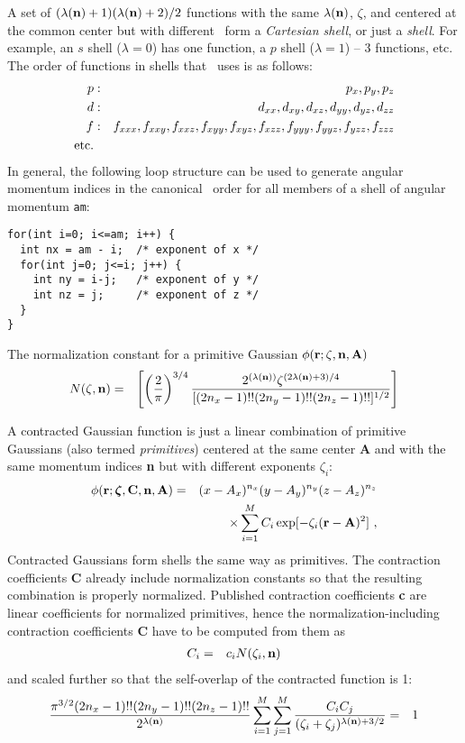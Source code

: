 \documentclass[12pt]{article}
\begin{document}
A set of $(\lambda({\bf n}) + 1)(\lambda({\bf n}) + 2)/2$ functions with the same $\lambda({\bf n})$, $\zeta$, and centered
at the common center
but with different \n\ form a {\em Cartesian shell},
or just a {\em shell}. For example, an $s$ shell ($\lambda=0$) has one function, a $p$ shell ($\lambda=1$) --
3 functions, etc.
The order of functions in shells that \LIBINT\ uses is as follows:
\begin{eqnarray}
p & : & p_x, p_y, p_z \nonumber \\
d & : & d_{xx}, d_{xy}, d_{xz}, d_{yy}, d_{yz}, d_{zz} \nonumber \\
f & : & f_{xxx}, f_{xxy}, f_{xxz}, f_{xyy}, f_{xyz}, f_{xzz}, f_{yyy}, f_{yyz}, f_{yzz}, f_{zzz} \nonumber \\
{\rm etc.} \nonumber
\end{eqnarray}
In general, the following loop structure can be used to generate angular momentum indices in the canonical \LIBINT\ order for all
members of a shell of angular momentum {\tt am}:
\begin{verbatim}
for(int i=0; i<=am; i++) {
  int nx = am - i;  /* exponent of x */
  for(int j=0; j<=i; j++) {
    int ny = i-j;   /* exponent of y */
    int nz = j;     /* exponent of z */
  }
}
\end{verbatim}

The normalization constant for a primitive Gaussian $\phi ({\bf r}; \zeta, {\bf n}, {\bf A})$
\begin{eqnarray}
N(\zeta,{\bf n}) & = & \left[ \left(\frac{2}{\pi}\right)^{3/4}\frac{2^{(\lambda({\bf n}))}\zeta^{(2\lambda({\bf n})+3)/4}}
                {[(2n_x-1)!!(2n_y-1)!!(2n_z-1)!!]^{1/2}} \right]
\end{eqnarray}

A contracted Gaussian function is just a linear combination of primitive Gaussians (also termed {\em primitives})
centered at the same center {\bf A} and with the same momentum indices {\bf n}
but with different exponents $\zeta_i$:
\begin{eqnarray}
\phi ({\bf r}; \bmath{\zeta}, {\bf C}, \n, {\bf A}) & = & (x - A_x)^{n_x} (y - A_y)^{n_y} (z - A_z)^{n_z} \nonumber \\
& & \times \sum_{i=1}^M C_i \exp [-\zeta_i ({\bf r}-{\bf A})^2]\ ,
\end{eqnarray}
Contracted Gaussians form shells the same way as primitives.
The contraction coefficients {\bf C} already include normalization constants so that the resulting combination
is properly normalized. Published contraction coefficients {\bf c} are linear coefficients for normalized primitives,
hence the normalization-including contraction coefficients {\bf C} have to be computed from them as
\begin{eqnarray} \label{eq:C1}
C_i & = & c_i N(\zeta_i,{\bf n})
\end{eqnarray}
and scaled further so that the self-overlap of the contracted function is 1:
\begin{eqnarray} \label{eq:C2}
\frac{\pi^{3/2} (2n_x-1)!!(2n_y-1)!!(2n_z-1)!!}{2^{\lambda({\bf n})}}
\sum_{i=1}^M \sum_{j=1}^M \frac{C_i C_j }{(\zeta_i+\zeta_j)^{\lambda({\bf n})+3/2}} & = & 1
\end{eqnarray}
\end{document}
